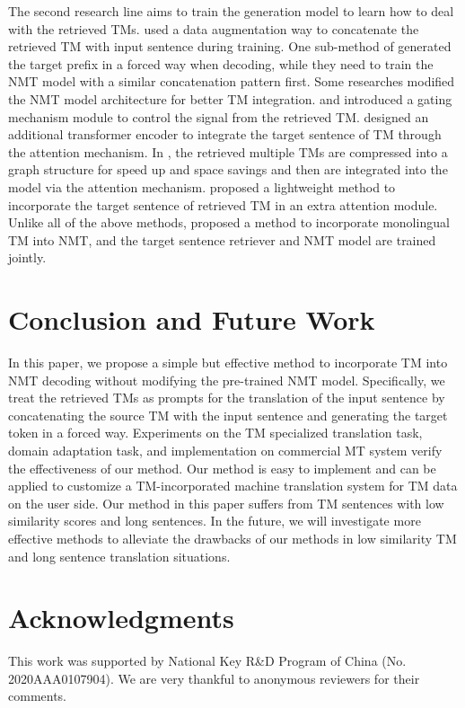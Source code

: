 \documentclass[letterpaper]{article} %
\begin{document}
The second research line aims to train the generation model to learn how to deal with the retrieved TMs. \citet{bulte2019neural,xu2020boosting,minh2020priming} used a data augmentation way to concatenate the retrieved TM with input sentence during training. One sub-method of \citet{minh2020priming} generated the target prefix in a forced way when decoding, while they need to train the NMT model with a similar concatenation pattern first. Some researches modified the NMT model architecture for better TM integration. \citet{cao2018encoding} and \citet{gu2018search} introduced a gating mechanism module to control the signal from the retrieved TM. \citet{qian2020Learning} designed an additional transformer encoder to integrate the target sentence of TM through the attention mechanism. In \citet{xia2019graph}, the retrieved multiple TMs are compressed into a graph structure for speed up and space savings and then are integrated into the model via the attention mechanism. \citet{he2021fast} proposed a lightweight method to incorporate the target sentence of retrieved TM in an extra attention module. Unlike all of the above methods, \citet{cai2021neural} proposed a method to incorporate monolingual TM into NMT, and the target sentence retriever and NMT model are trained jointly.

\section{Conclusion and Future Work}

In this paper, we propose a simple but effective method to incorporate TM into NMT decoding without modifying the pre-trained NMT model. Specifically, we treat the retrieved TMs as prompts for the translation of the input sentence by concatenating the source TM with the input sentence and generating the target token in a forced way. Experiments on the TM specialized translation task, domain adaptation task, and implementation on commercial MT system verify the effectiveness of our method. Our method is easy to implement and can be applied to customize a TM-incorporated machine translation system for TM data on the user side. Our method in this paper suffers from TM sentences with low similarity scores and long sentences. In the future, we will investigate more effective methods to alleviate the drawbacks of our methods in low similarity TM and long sentence translation situations. 


\section{Acknowledgments}

This work was supported by National Key R\&D Program of China (No. 2020AAA0107904). We are very thankful to anonymous reviewers for their comments.


\end{document}
